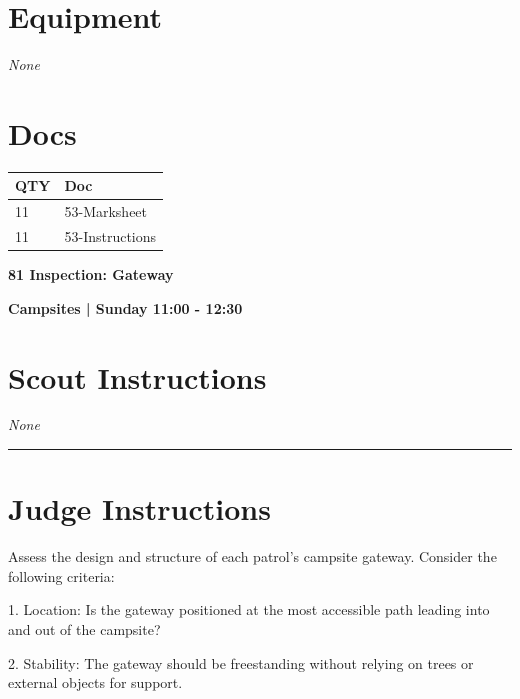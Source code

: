\documentclass[10pt]{article}
\newcommand{\newtitle}[1]{\begin{center}{\Huge\bfseries #1 }\\ \vspace{5mm}\end{center}}
\newcommand{\newsubtitle}[1]{\begin{center}{\color{grey}\Large\bfseries #1 }\\ \vspace{5mm}\end{center}}
\begin{document}
	\begin{multicols}{2}

		\section*{\faWrench \: Equipment}

				\textit{None}
		
		\vfill\null
		\columnbreak

			\section*{\faFile \: Docs}
		 	\begin{center}
			\begin{tabular}{p{2cm}p{4cm}}

			\textbf{QTY} & \textbf{Doc} \\\toprule
										11&53-Marksheet\\\midrule
										11&53-Instructions\\\midrule
							\end{tabular}
			\end{center}
	

		\vfill\null

		\end{multicols}



	\vspace{1cm}


	\clearpage
		\newtitle{81 Inspection: Gateway }
	\newsubtitle{Campsites | Sunday 11:00 - 12:30}
		\setcounter{section}{80}
	\section*{Scout Instructions}
		\textit{None}
	
	\vspace{0.5cm}
	\hrule
	\vspace{0.5cm}

		\section*{Judge Instructions}
		Assess the design and structure of each patrol's campsite gateway. Consider the following criteria:



1. Location: Is the gateway positioned at the most accessible path leading into and out of the campsite?

2. Stability: The gateway should be freestanding without relying on trees or external objects for support.
\end{document}
